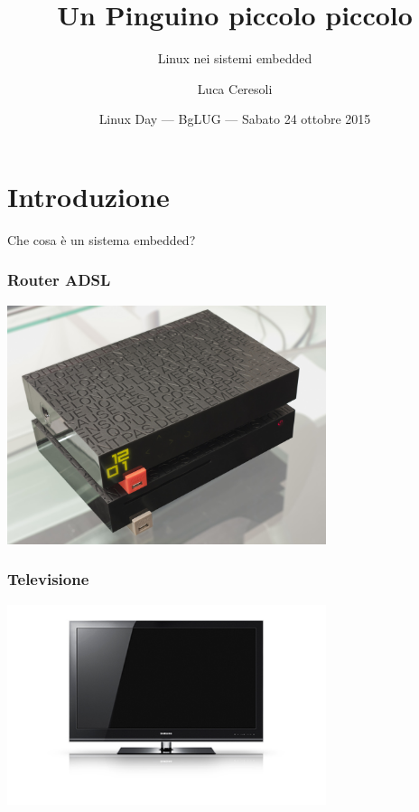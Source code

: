 \documentclass[xetex,table]{beamer}
\title{Un Pinguino piccolo piccolo}
\subtitle{Linux nei sistemi embedded}
\author{Luca Ceresoli}
\date{Linux Day --- BgLUG --- Sabato 24 ottobre 2015}
\begin{document}
\maketitle

\section{Introduzione}

  \begin{frame}{}
    \huge
    \begin{center}
      Che cosa è un sistema embedded?
    \end{center}
  \end{frame}

\begin{frame}
  \frametitle{Router ADSL}
  \begin{center}
    \includegraphics[width=0.7\textwidth]{images/freebox.jpg}
  \end{center}
\end{frame}

\begin{frame}
\frametitle{Televisione}
  \begin{center}
    \includegraphics[width=0.7\textwidth]{images/television.jpg}
  \end{center}
\end{frame}
\end{document}
